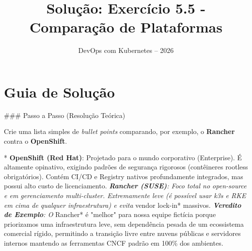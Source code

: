 \documentclass[11pt,a4paper]{article}
\title{\color{secondary}\Huge\textbf{Solução: Exercício 5.5 - Comparação de Plataformas}}
\author{\color{primary}DevOps com Kubernetes -- 2026}
\date{}
\begin{document}
\maketitle

\section*{\color{primary}Guia de Solução}
\begin{tcolorbox}[colback=green!5!white,colframe=green!60!black,title=Resolução Passo a Passo]
### Passo a Passo (Resolução Teórica)

Crie uma lista simples de \textit{bullet points} comparando, por exemplo, o \textbf{Rancher} contra o \textbf{OpenShift}.

*   \textbf{OpenShift (Red Hat)}: Projetado para o mundo corporativo (Enterprise). É altamente opinativo, exigindo padrões de segurança rigorosos (contêineres rootless obrigatórios). Contém CI/CD e Registry nativos profundamente integrados, mas possui alto custo de licenciamento.
\textit{   \textbf{Rancher (SUSE)}: Foco total no open-source e em gerenciamento multi-cluster. Extremamente leve (é possível usar k3s e RKE em cima de qualquer infraestrutura) e evita }vendor lock-in* massivos. 
\textit{   \textbf{Veredito de Exemplo}: O }Rancher* é "melhor" para nossa equipe fictícia porque priorizamos uma infraestrutura leve, sem dependência pesada de um ecossistema comercial rígido, permitindo a transição livre entre nuvens públicas e servidores internos mantendo as ferramentas CNCF padrão em 100\% dos ambientes.
\end{tcolorbox}
\end{document}
